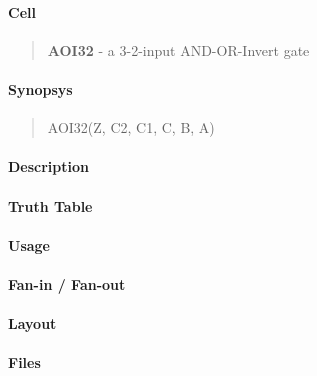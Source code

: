 \label{AOI32}
\paragraph{Cell}
\begin{quote}
    \textbf{AOI32} - a 3-2-input AND-OR-Invert gate
\end{quote}

\paragraph{Synopsys}
\begin{quote}
    AOI32(Z, C2, C1, C, B, A)
\end{quote}

\paragraph{Description}



\paragraph{Truth Table}


\paragraph{Usage}

\paragraph{Fan-in / Fan-out}

\paragraph{Layout}

\paragraph{Files}
